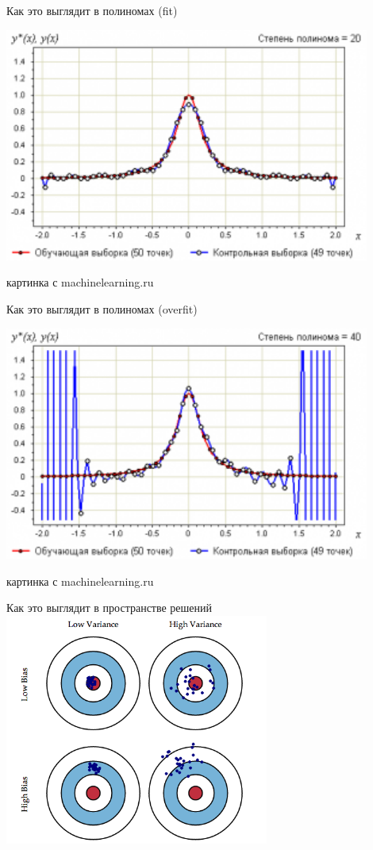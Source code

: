 \documentclass[14pt, fleqn, xcolor={dvipsnames, table}]{beamer}
\begin{document}
\begin{frame}{Как это выглядит в полиномах (fit)}
\begin{center}
\includegraphics[width=0.9\textwidth]{300px-LsmRunge20.png}
\end{center}
{\footnotesize картинка с machinelearning.ru}
\end{frame}

\begin{frame}{Как это выглядит в полиномах (overfit)}
\begin{center}
\includegraphics[width=0.9\textwidth]{300px-LsmRunge40.png}
\end{center}
{\footnotesize картинка с machinelearning.ru}
\end{frame}

\begin{frame}{Как это выглядит в пространстве решений}
\centering
\includegraphics[width=0.65\textwidth]{bias_variance.png} 
\end{frame}
\end{document}
